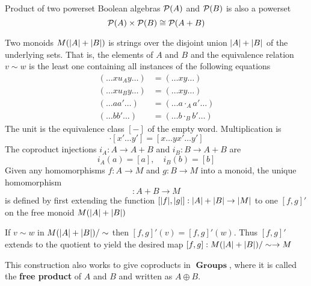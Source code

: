 \documentclass[11pt]{article}
\DeclareMathOperator{\Groups}{\textbf{Groups}}
\begin{document}
Product of two powerset Boolean algebras \(\mathcal{P}(A)\) and \(\mathcal{P}(B)\) is
also a powerset
\begin{equation*}
\mathcal{P}(A)\times\mathcal{P}(B)\cong\mathcal{P}(A+B)
\end{equation*}  
\begin{examplle}[]
Two monoids \(M(\abs{A}+\abs{B})\) is strings over the disjoint union
\(\abs{A}+\abs{B}\) of the underlying sets. That is, the elements of \(A\)
and \(B\) and the equivalence relation \(v\sim w\) is the least one
containing all instances of the following equations
\begin{align*}
(\dots xu_Ay\dots)&=(\dots xy\dots)\\
(\dots xu_By\dots)&=(\dots xy\dots)\\
(\dots aa'\dots)&=(\dots a\cdot_A a'\dots)\\
(\dots bb'\dots)&=(\dots b\cdot_B b'\dots)
\end{align*}
The unit is the equivalence class \([-]\) of the empty word. Multiplication
is
\begin{equation*}
[x\dots y]\cdot[x'\dots y']=[x\dots yx'\dots y']
\end{equation*}
The coproduct injections \(i_A:A\to A+B\) and \(i_B:B\to A+B\) are
\begin{equation*}
i_A(a)=[a],\quad i_B(b)=[b]
\end{equation*}
Given any homomorphisms \(f:A\to M\) and \(g:B\to M\) into a monoid, the
unique homomorphism
\begin{equation*}
[f,g]:A+B\to M
\end{equation*}
is defined by first extending the function
\([\abs{f},\abs{g}]:\abs{A}+\abs{B}\to\abs{M}\) to one \([f,g]'\) on the free
monoid \(M(\abs{A}+\abs{B})\)
\begin{center}\end{center}
If \(v\sim w\) in \(M(\abs{A}+\abs{B})/\sim\) then \([f,g]'(v)=[f,g]'(w)\).
Thus \([f,g]'\) extends to the quotient to yield the desired map
\([f,g]:M(\abs{A}+\abs{B})/\sim\to M\)

This construction also works to give coproducts in \(\Groups\), where it is
called the \textbf{free product} of \(A\) and \(B\) and written as \(A\oplus B\).
\end{examplle}
\end{document}
